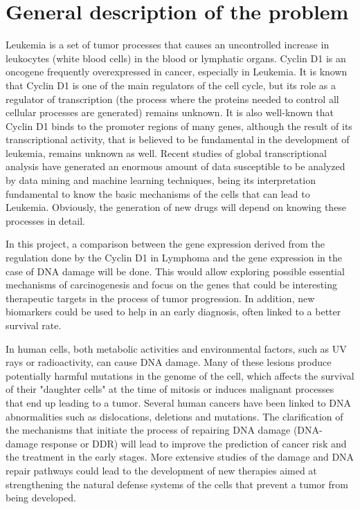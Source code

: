 
\section{General description of the problem}

Leukemia is a set of tumor processes that causes an uncontrolled increase in leukocytes (white blood cells) in the blood or lymphatic organs. Cyclin D1 is an oncogene frequently overexpressed in cancer, especially in Leukemia.
It is known that Cyclin D1 is one of the main regulators of the cell cycle, but its role as a regulator of transcription (the process where the proteins needed to control all cellular processes are generated) remains unknown.
It is also well-known that Cyclin D1 binds to the promoter regions of many genes, although the result of its transcriptional activity, that is believed to be fundamental in the development of leukemia, remains unknown as well.
Recent studies of global transcriptional analysis have generated an enormous amount of data susceptible to be analyzed by data mining and machine learning techniques, being its interpretation fundamental to know the basic mechanisms of the cells that can lead to Leukemia.
Obviously, the generation of new drugs will depend on knowing these processes in detail.

In this project, a comparison between the gene expression derived from the regulation done by the Cyclin D1 in Lymphoma and the gene expression in the case of DNA damage will be done. This would allow exploring possible essential mechanisms of carcinogenesis and focus on the genes that could be interesting therapeutic targets in the process of tumor progression. In addition, new biomarkers could be used to help in an early diagnosis, often linked to a better survival rate.

In human cells, both metabolic activities and environmental factors, such as UV rays or radioactivity, can cause DNA damage. Many of these lesions produce potentially harmful mutations in the genome of the cell, which affects the survival of their "daughter cells" at the time of mitosis or induces malignant processes that end up leading to a tumor. Several human cancers have been linked to DNA abnormalities such as dislocations, deletions and mutations. The clarification of the mechanisms that initiate the process of repairing DNA damage (DNA-damage response or DDR) will lead to improve the prediction of cancer risk and the treatment in the early stages. More extensive studies of the damage and DNA repair pathways could lead to the development of new therapies aimed at strengthening the natural defense systems of the cells that prevent a tumor from being developed.

